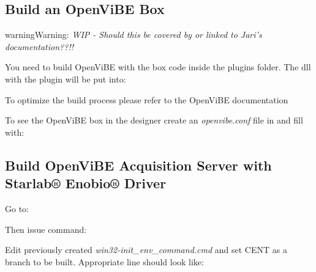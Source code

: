 \documentclass[letterpaper,10pt,english]{sphinxmanual}
\begin{document}
\subsection{Build an OpenViBE Box}
\label{index:build-an-openvibe-box}\label{index:build-ov-box}
\begin{notice}{warning}{Warning:}
\emph{WIP    -       Should this be covered by or linked to Jari's documentation??!!}
\end{notice}

You need to build OpenViBE with the box code inside the plugins folder. The dll with the plugin will be put into:
\begin{quote}

\end{quote}

To optimize the build process please refer to the OpenViBE documentation

To see the OpenViBE box in the designer create an \emph{openvibe.conf} file in  and fill with:
\begin{quote}

\end{quote}


\subsection{Build OpenViBE Acquisition Server with Starlab® Enobio® Driver}
\label{index:build-ov-acq-serv}\label{index:build-openvibe-acquisition-server-with-starlab-enobio-driver}
Go to:
\begin{quote}

\end{quote}

Then issue command:
\begin{quote}

\end{quote}

Edit previously created \emph{win32-init\_env\_command.cmd} and set CENT as a branch to be built. Appropriate line should look like:
\begin{quote}

\end{quote}
\end{document}
